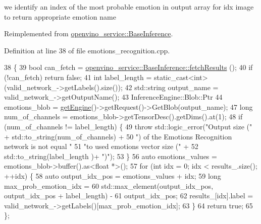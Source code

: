 we identify an index of the most probable emotion in output array for idx image to return appropriate emotion name 

Reimplemented from \hyperlink{classopenvino__service_1_1BaseInference_a9604e193581d6f458634035059342a2c}{openvino\+\_\+service\+::\+Base\+Inference}.



Definition at line 38 of file emotions\+\_\+recognition.\+cpp.


\begin{DoxyCode}
38                                                      \{
39   \textcolor{keywordtype}{bool} can\_fetch = \hyperlink{classopenvino__service_1_1BaseInference_a9604e193581d6f458634035059342a2c}{openvino\_service::BaseInference::fetchResults}
      ();
40   \textcolor{keywordflow}{if} (!can\_fetch) \textcolor{keywordflow}{return} \textcolor{keyword}{false};
41   \textcolor{keywordtype}{int} label\_length = \textcolor{keyword}{static\_cast<}\textcolor{keywordtype}{int}\textcolor{keyword}{>}(valid\_network\_->getLabels().size());
42   std::string output\_name = valid\_network\_->getOutputName();
43   InferenceEngine::Blob::Ptr
44       emotions\_blob = \hyperlink{classopenvino__service_1_1BaseInference_a27ef6d92c87dec4480f818a2bcca62a4}{getEngine}()->getRequest()->GetBlob(output\_name);
47   \textcolor{keywordtype}{long} num\_of\_channels = emotions\_blob->getTensorDesc().getDims().at(1);
48   \textcolor{keywordflow}{if} (num\_of\_channels != label\_length) \{
49     \textcolor{keywordflow}{throw} std::logic\_error(\textcolor{stringliteral}{"Output size ("} + std::to\_string(num\_of\_channels) +
50         \textcolor{stringliteral}{") of the Emotions Recognition network is not equal "}
51         \textcolor{stringliteral}{"to used emotions vector size ("} +
52         std::to\_string(label\_length )+ \textcolor{stringliteral}{")"});
53   \}
56   \textcolor{keyword}{auto} emotions\_values = emotions\_blob->buffer().as<\textcolor{keywordtype}{float} *>();
57   \textcolor{keywordflow}{for} (\textcolor{keywordtype}{int} idx = 0; idx < results\_.size(); ++idx) \{
58     \textcolor{keyword}{auto} output\_idx\_pos = emotions\_values + idx;
59     \textcolor{keywordtype}{long} max\_prob\_emotion\_idx =
60         std::max\_element(output\_idx\_pos, output\_idx\_pos + label\_length) -
61             output\_idx\_pos;
62     results\_[idx].label = valid\_network\_->getLabels()[max\_prob\_emotion\_idx];
63   \}
64   \textcolor{keywordflow}{return} \textcolor{keyword}{true};
65 \};
\end{DoxyCode}
